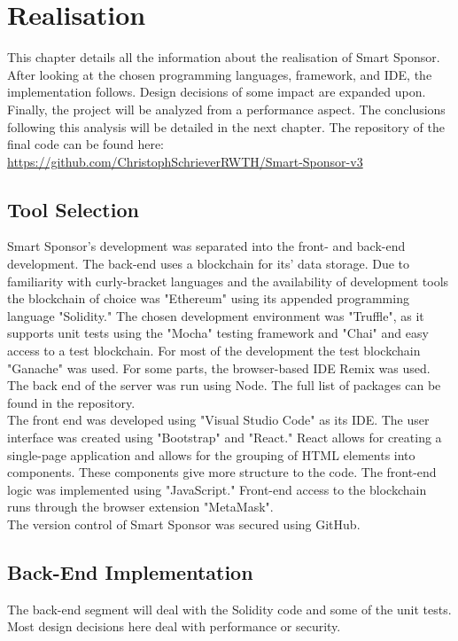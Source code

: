 \chapter{Realisation}
This chapter details all the information about the realisation of Smart Sponsor. After looking at the chosen programming languages, framework, and IDE, the implementation follows. Design decisions of some impact are expanded upon. Finally, the project will be analyzed from a performance aspect. The conclusions following this analysis will be detailed in the next chapter. The repository of the final code can be found here:
\url{https://github.com/ChristophSchrieverRWTH/Smart-Sponsor-v3}
\section{Tool Selection}
Smart Sponsor's development was separated into the front- and back-end development. The back-end uses a blockchain for its' data storage. Due to familiarity with curly-bracket languages and the availability of development tools the blockchain of choice was "Ethereum" using its appended programming language "Solidity." The chosen development environment was "Truffle"\cite{truffle}, as it supports unit tests using the "Mocha" testing framework and "Chai" and easy access to a test blockchain. For most of the development the test blockchain "Ganache"\cite{truffle} was used. For some parts, the browser-based IDE Remix\cite{remix} was used. The back end of the server was run using Node. The full list of packages can be found in the repository.\\
The front end was developed using "Visual Studio Code" as its IDE. The user interface was created using "Bootstrap" and "React." React allows for creating a single-page application and allows for the grouping of HTML elements into components. These components give more structure to the code. The front-end logic was implemented using "JavaScript." Front-end access to the blockchain runs through the browser extension "MetaMask"\cite{meta}.\\
The version control of Smart Sponsor was secured using GitHub.
\section{Back-End Implementation}
The back-end segment will deal with the Solidity code and some of the unit tests. Most design decisions here deal with performance or security.
